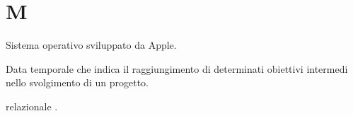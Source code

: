 \section{M}

Sistema operativo sviluppato da Apple.

Data temporale che indica il raggiungimento di determinati obiettivi intermedi nello svolgimento di un progetto. 


 relazionale .